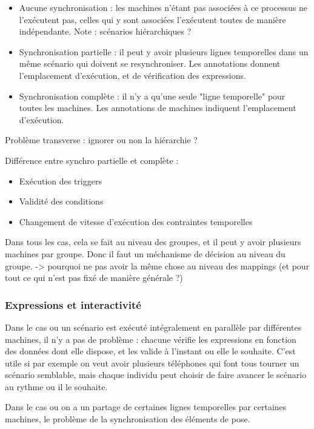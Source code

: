\documentclass{article}
\begin{document}
\begin{itemize}
    \item Aucune synchronisation : les machines n'étant pas associées à ce processus ne l'exécutent pas, celles qui y sont associées l'exécutent toutes de manière indépendante. Note : scénarios hiérarchiques ? 
    \item Synchronisation partielle : il peut y avoir plusieurs lignes temporelles dans un même scénario qui doivent se resynchroniser. Les annotations donnent l'emplacement d'exécution, et de vérification des expressions.
    \item Synchronisation complète : il n'y a qu'une seule "ligne temporelle" pour toutes les machines. Les annotations de machines indiquent l'emplacement d'exécution.
\end{itemize}

Problème transverse : ignorer ou non la hiérarchie ? 

Différence entre synchro partielle et complète : 
\begin{itemize}
    \item Exécution des triggers
    \item Validité des conditions
    \item Changement de vitesse d'exécution des contraintes temporelles
\end{itemize}

Dans tous les cas, cela se fait au niveau des groupes, et il peut y avoir plusieurs machines par groupe.
Donc il faut un méchanisme de décision au niveau du groupe.
-> pourquoi ne pas avoir la même chose au niveau des mappings (et pour tout ce qui n'est pas fixé de manière générale ?)


\subsubsection{Expressions et interactivité}
Dans le cas ou un scénario est exécuté intégralement en parallèle par différentes machines, il n'y a pas de problème : chacune vérifie les expressions en fonction des données dont elle dispose, et les valide à l'instant ou elle le souhaite. C'est utile si par exemple on veut avoir plusieurs téléphones qui font tous tourner un scénario semblable, mais chaque individu peut choisir de faire avancer le scénario au rythme ou il le souhaite.

Dans le cas ou on a un partage de certaines lignes temporelles par certaines machines, le problème de la synchronisation des éléments de pose.
\end{document}
